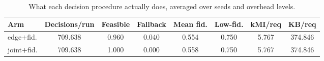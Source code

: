 \begin{table}
\centering
\scriptsize
\caption{What each decision procedure actually does, averaged over seeds and overhead levels.}
\label{tab:p2-decisions}
\begin{tabular}{lccccccc}
\toprule
Arm & Decisions/run & Feasible & Fallback & Mean fid. & Low-fid. & kMI/req & KB/req \\
\midrule
edge$+$fid. & 709.638 & 0.960 & 0.040 & 0.554 & 0.750 & 5.767 & 374.846 \\
joint$+$fid. & 709.638 & 1.000 & 0.000 & 0.558 & 0.750 & 5.767 & 374.846 \\
\bottomrule
\end{tabular}
\par\vspace{2pt}{\footnotesize\raggedright Feasible is the share of decisions for which the predicted completion met the target; fallback is the share that could not and used the first admissible node. Per-request overhead is measured on the generated tasks, not on the decision log.\par}
\end{table}
